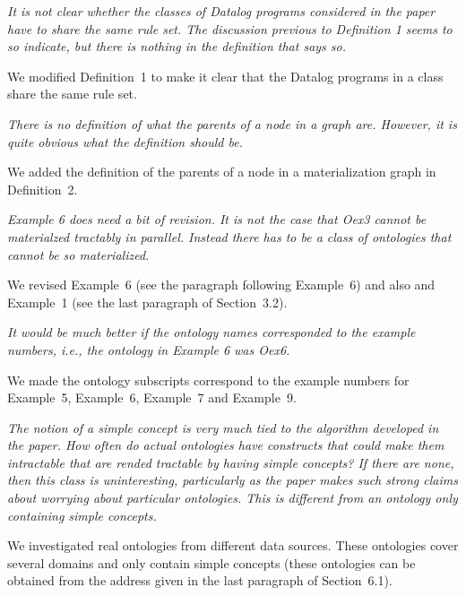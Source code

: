 \documentclass{article}
\let\quoteOld\quote
\let\endquoteOld\endquote
\renewenvironment{quote}{\quoteOld\itshape}{\endquoteOld}
\begin{document}
\begin{quote}
It is not clear whether the classes of Datalog programs considered in the
paper have to share the same rule set.  The discussion previous to
Definition 1 seems to so indicate, but there is nothing in the definition
that says so.
\end{quote}

We modified Definition~1 to make it clear that the Datalog programs
in a class share the same rule set.

\begin{quote}
There is no definition of what the parents of a node in a graph are.
However, it is quite obvious what the definition should be.
\end{quote}

We added the definition of the parents of a node in a materialization graph in Definition~2.

\begin{quote}
Example 6 does need a bit of revision.  It is not the case that Oex3 cannot
be materialzed tractably in parallel.  Instead there has to be a class of
ontologies that cannot be so materialized.
\end{quote}

We revised Example~6 (see the paragraph following Example~6) and also
and Example~1 (see the last paragraph of Section~3.2).


\begin{quote}
It would be much better if the ontology names corresponded to the example
numbers, i.e., the ontology in Example 6 was Oex6.
\end{quote}

We made the ontology subscripts correspond to the example numbers
for Example~5, Example~6, Example~7 and Example~9.


\begin{quote}
The notion of a simple concept is very much tied to the algorithm developed
in the paper.  How often do actual ontologies have constructs that could
make them intractable that are rended tractable by having simple concepts?
If there are none, then this class is uninteresting, particularly as the
paper makes such strong claims about worrying about particular ontologies.
This is different from an ontology only containing simple concepts.
\end{quote}


We investigated real ontologies from different data sources. These ontologies cover
several domains and only contain simple concepts (these ontologies can be
obtained from the address given in the last paragraph of
Section~6.1).\\
\end{document}

